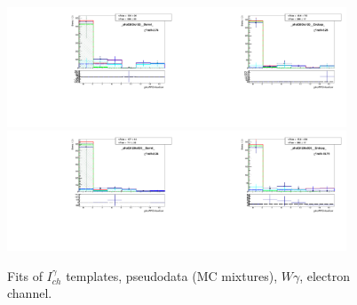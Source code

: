 \begin{figure}[htb]
\begin{center}
   \includegraphics[width=0.45\textwidth]{../figs/figs_v11/ELECTRON_WGamma/TemplateFits/c_TEMPL_CHISO_UNblind__phoEt95to120__Barrel__RooFit_MCclosure.pdf}\includegraphics[width=0.45\textwidth]{../figs/figs_v11/ELECTRON_WGamma/TemplateFits/c_TEMPL_CHISO_UNblind__phoEt95to120__Endcap__RooFit_MCclosure.pdf}\\
   \includegraphics[width=0.45\textwidth]{../figs/figs_v11/ELECTRON_WGamma/TemplateFits/c_TEMPL_CHISO_UNblind__phoEt120to500__Barrel__RooFit_MCclosure.pdf}\includegraphics[width=0.45\textwidth]{../figs/figs_v11/ELECTRON_WGamma/TemplateFits/c_TEMPL_CHISO_UNblind__phoEt120to500__Endcap__RooFit_MCclosure.pdf}\\
  \label{fig:templateFits_MCclosure_CHISO_ELECTRON_3}
  \caption{Fits of $I_{ch}^{\gamma}$ templates, pseudodata (MC mixtures), $W\gamma$, electron channel.}
  \end{center}
\end{figure}

